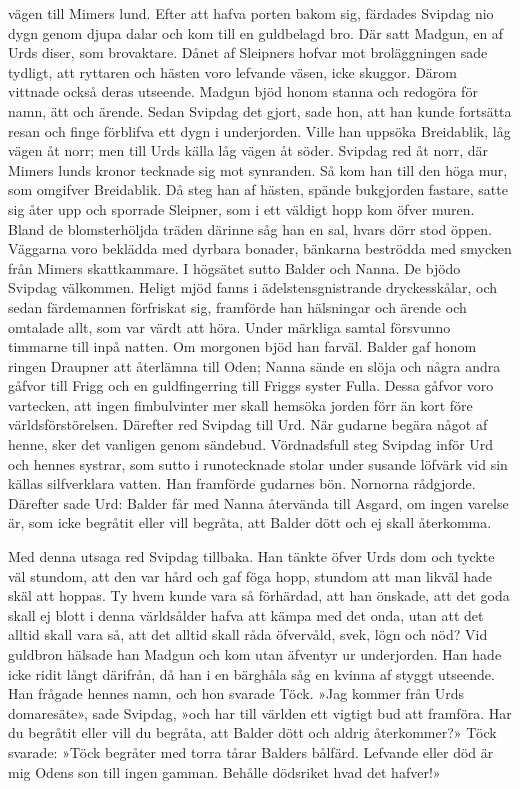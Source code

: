 vägen till Mimers lund. Efter att hafva porten bakom sig, färdades
Svipdag nio dygn genom djupa dalar och kom till en guldbelagd bro. Där
satt Madgun, en af Urds diser, som brovaktare. Dånet af Sleipners hofvar
mot broläggningen sade tydligt, att ryttaren och hästen voro lefvande
väsen, icke skuggor. Därom vittnade också deras utseende. Madgun bjöd
honom stanna och redogöra för namn, ätt och ärende. Sedan Svipdag det
gjort, sade hon, att han kunde fortsätta resan och finge förblifva ett
dygn i underjorden. Ville han uppsöka Breidablik, låg vägen åt norr; men
till Urds källa låg vägen åt söder. Svipdag red åt norr, där Mimers
lunds kronor tecknade sig mot synranden. Så kom han till den höga mur,
som omgifver Breidablik. Då steg han af hästen, spände bukgjorden
fastare, satte sig åter upp och sporrade Sleipner, som i ett väldigt
hopp kom öfver muren. Bland de blomsterhöljda träden därinne såg han en
sal, hvars dörr stod öppen. Väggarna voro beklädda med dyrbara bonader,
bänkarna beströdda med smycken från Mimers skattkammare. I högsätet
sutto Balder och Nanna. De bjödo Svipdag välkommen. Heligt mjöd fanns i
ädelstensgnistrande dryckesskålar, och sedan färdemannen förfriskat sig,
framförde han hälsningar och ärende och omtalade allt, som var värdt att
höra. Under märkliga samtal försvunno timmarne till inpå natten. Om
morgonen bjöd han farväl. Balder gaf honom ringen Draupner att återlämna
till Oden; Nanna sände en slöja och några andra gåfvor till Frigg och en
guldfingerring till Friggs syster Fulla. Dessa gåfvor voro vartecken,
att ingen fimbulvinter mer skall hemsöka jorden förr än kort före
världsförstörelsen. Därefter red Svipdag till Urd. När gudarne begära
något af henne, sker det vanligen genom sändebud. Vördnadsfull steg
Svipdag inför Urd och hennes systrar, som sutto i runotecknade stolar
under susande löfvärk vid sin källas silfverklara vatten. Han framförde
gudarnes bön. Nornorna rådgjorde. Därefter sade Urd: Balder får med
Nanna återvända till Asgard, om ingen varelse är, som icke begråtit
eller vill begråta, att Balder dött och ej skall återkomma.



Med denna utsaga red Svipdag tillbaka. Han tänkte öfver Urds dom och
tyckte väl stundom, att den var hård och gaf föga hopp, stundom att man
likväl hade skäl att hoppas. Ty hvem kunde vara så förhärdad, att han
önskade, att det goda skall ej blott i denna världsålder hafva att kämpa
med det onda, utan att det alltid skall vara så, att det alltid skall
råda öfvervåld, svek, lögn och nöd? Vid guldbron hälsade han Madgun och
kom utan äfventyr ur underjorden. Han hade icke ridit långt därifrån, då
han i en bärghåla såg en kvinna af styggt utseende. Han frågade hennes
namn, och hon svarade Töck. »Jag kommer från Urds domaresäte», sade
Svipdag, »och har till världen ett vigtigt bud att framföra. Har du
begråtit eller vill du begråta, att Balder dött och aldrig återkommer?»
Töck svarade: »Töck begråter med torra tårar Balders bålfärd. Lefvande
eller död är mig Odens son till ingen gamman. Behålle dödsriket hvad det
hafver!»

